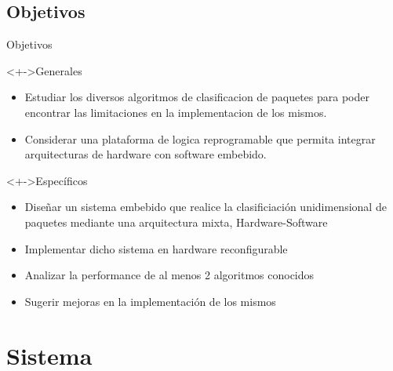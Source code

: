 \documentclass[xcolor=dvipsnames]{beamer}
\begin{document}
\subsection{Objetivos}
\begin{frame}{Objetivos}
\begin{block}<+->{Generales}   
    \begin{itemize}
      \scriptsize
      \item Estudiar los diversos algoritmos de clasificacion de paquetes para poder encontrar las limitaciones en la implementacion de los mismos.
      \item Considerar una plataforma de logica reprogramable que permita integrar arquitecturas de hardware con software embebido.
    \end{itemize}
  \end{block}
  
\begin{block}<+->{Específicos}   
    \begin{itemize}
      \scriptsize
     	\item Diseñar un sistema embebido que realice la clasificiación unidimensional de paquetes mediante una arquitectura mixta, Hardware-Software
	\item Implementar dicho sistema en hardware reconfigurable
	\item Analizar la performance de al menos 2 algoritmos conocidos
	\item Sugerir mejoras en la implementación de los mismos   
    \end{itemize}
  \end{block}
\end{frame}


\section{Sistema}
\end{document}
